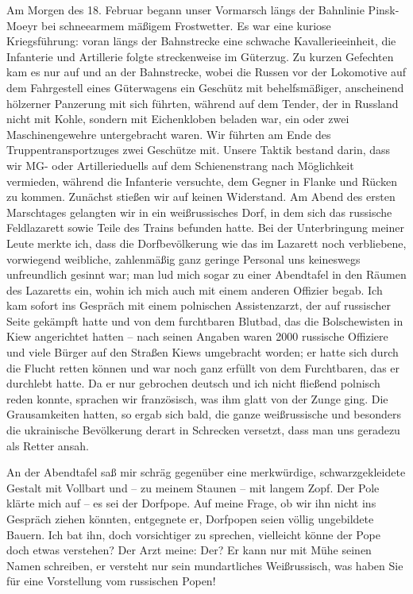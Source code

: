 \documentclass[a5paper,pagesize,10pt,twoside=true]{scrbook}
\begin{document}
Am Morgen des 18. Februar begann unser Vormarsch längs der Bahnlinie Pinsk-Moeyr bei schneearmem mäßigem Frostwetter. Es war eine kuriose Kriegsführung: voran längs der Bahnstrecke eine schwache Kavallerieeinheit, die Infanterie und Artillerie folgte streckenweise im Güterzug. Zu kurzen Gefechten kam es nur auf und an der Bahnstrecke, wobei die Russen vor der Lokomotive auf dem Fahrgestell eines Güterwagens ein Geschütz mit behelfsmäßiger, anscheinend hölzerner Panzerung mit sich führten, während auf dem Tender, der in Russland nicht mit Kohle, sondern mit Eichenkloben beladen war, ein oder zwei Maschinengewehre untergebracht waren. Wir führten am Ende des Truppentransportzuges zwei Geschütze mit. Unsere Taktik bestand darin, dass wir MG- oder Artillerieduells auf dem Schienenstrang nach Möglichkeit vermieden, während die Infanterie versuchte, dem Gegner in Flanke und Rücken zu kommen. Zunächst stießen wir auf keinen Widerstand. Am Abend des ersten Marschtages gelangten wir in ein weißrussisches Dorf, in dem sich das russische Feldlazarett sowie Teile des Trains befunden hatte. Bei der Unterbringung meiner Leute merkte ich, dass die Dorfbevölkerung wie das im Lazarett noch verbliebene, vorwiegend weibliche, zahlenmäßig ganz geringe Personal uns keineswegs unfreundlich gesinnt war; man lud mich sogar zu einer Abendtafel in den Räumen des Lazaretts ein, wohin ich mich auch mit einem anderen Offizier begab. Ich kam sofort ins Gespräch mit einem polnischen Assistenzarzt, der auf russischer Seite gekämpft hatte und von dem furchtbaren Blutbad, das die Bolschewisten in Kiew angerichtet hatten -- nach seinen Angaben waren \num{2000} russische Offiziere und viele Bürger auf den Straßen Kiews umgebracht worden; er hatte sich durch die Flucht retten können und war noch ganz erfüllt von dem Furchtbaren, das er durchlebt hatte. Da er nur gebrochen deutsch und ich nicht fließend polnisch reden konnte, sprachen wir französisch, was ihm glatt von der Zunge ging. Die Grausamkeiten hatten, so ergab sich bald, die ganze weißrussische und besonders die ukrainische Bevölkerung derart in Schrecken versetzt, dass man uns geradezu als Retter ansah.

An der Abendtafel saß mir schräg gegenüber eine merkwürdige, schwarzgekleidete Gestalt mit Vollbart und -- zu meinem Staunen -- mit langem Zopf. Der Pole klärte mich auf -- es sei der Dorfpope. Auf meine Frage, ob wir ihn nicht ins Gespräch ziehen könnten, entgegnete er, Dorfpopen seien völlig ungebildete Bauern. Ich bat ihn, doch vorsichtiger zu sprechen, vielleicht könne der Pope doch etwas verstehen? Der Arzt meine: Der? Er kann nur mit Mühe seinen Namen schreiben, er versteht nur sein mundartliches Weißrussisch, was haben Sie für eine Vorstellung vom russischen Popen!
\end{document}
